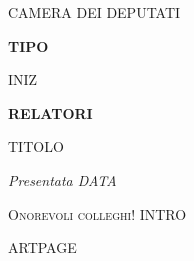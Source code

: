 \documentclass[12pt, a4paper]{article}
\author{@SirFabio}
\newcommand\entry[1]{\par\vspace{#1}\ignorespaces}
\begin{document}
\begingroup
\centering
\vspace*{0.5cm}%
\parbox[t]{10.25cm}{\vspace{0pt}%
  \MakeUppercase{\Huge Camera Dei Deputati}\par} \parbox[t]{0pt}{\vspace{0pt}%
  \par\clap{\rule[8pt]{4mm}{0.4pt}}%
}

\entry{6pt} \hspace{\fill}\makebox[3cm]{\hrulefill}\hspace{\fill}

\entry{2cm}
\textbf{\Large {{TIPO}}}
\entry{0.9cm}
\scriptsize{\scshape{{{INIZ}}}}\quad
\entry{0.5cm}
\normalsize{\bfseries{{{RELATORI}}}}\quad

\entry{0pt} \hspace{\fill}\makebox[9mm]{\hrulefill}\hspace{\fill}

\entry{1cm}
{{TITOLO}}\quad

\entry{1.5cm} \hspace{\fill}\makebox[22mm]{\hrulefill}\hspace{\fill}
\entry{1.5mm}

\scriptsize{\emph{Presentata {{DATA}}}}\quad
\entry{0.5pt} \hspace{\fill}\makebox[22mm]{\hrulefill}\hspace{\fill}

\vspace{\baselineskip}\par
\endgroup

\begin{multicols}{2}
  \textsc{Onorevoli colleghi!} {{INTRO}}
\end{multicols}



{{ARTPAGE}}
\end{document}
